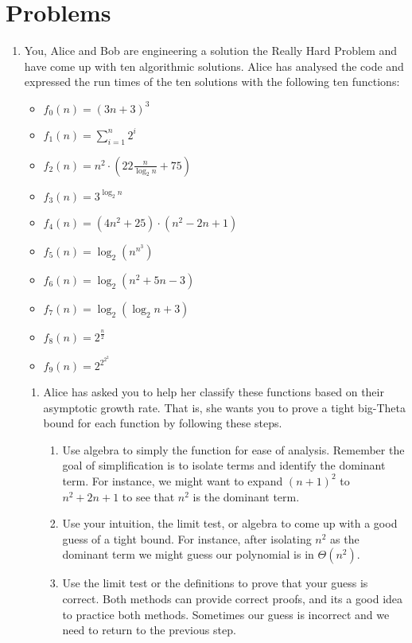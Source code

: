 \documentclass[paper=a4, fontsize=11pt]{scrartcl}
\numberwithin{equation}{section}		%
\numberwithin{figure}{section}			%
\numberwithin{table}{section}				%
\begin{document}
\section{Problems}
\begin{enumerate}
\item You, Alice and Bob are engineering a solution the Really Hard Problem and have come up with ten algorithmic solutions. Alice has analysed the code and expressed the run times of the ten solutions with the following ten functions:

\begin{itemize}
    \item $f_0(n) = (3n + 3)^3$ 
    \item $f_1(n) = \sum_{i=1}^n2^i$  
    \item $f_2(n) = n^2\cdot(22\frac{n}{\log_2n} + 75)$ 
    \item $f_3(n) = 3^{\log_2n}$
    \item $f_4(n) = (4n^2+25)\cdot(n^2-2n+1)$
    \item $f_5(n) = \log_2\left(n^{n^3}\right)$
    \item $f_6(n) = \log_2\left(n^2 + 5n - 3\right)$
    \item $f_7(n) = \log_2\left(\log_2n + 3\right)$
    \item $f_8(n) = 2^{\frac{n}{2}}$
    \item $f_9(n) = 2^{2^{2^2}}$
\end{itemize}

\begin{enumerate}
    \item Alice has asked you to help her classify these functions based on their asymptotic growth rate. That is, she wants you to prove a tight big-Theta bound for each function by following these steps.
    \begin{enumerate}
        \item Use algebra to simply the function for ease of analysis. Remember the goal of simplification is to isolate terms and identify the dominant term. For instance, we might want to expand $(n+1)^2$ to $n^2 +2n +1$ to see that $n^2$ is the dominant term.
        
        \item Use your intuition, the limit test, or algebra to come up with a good guess of a tight bound. For instance, after isolating $n^2$ as the dominant term we might guess our polynomial is in $\Theta(n^2)$.
        
        \item Use the limit test or the definitions to prove that your guess is correct. Both methods can provide correct proofs, and its a good idea to practice both methods. Sometimes our guess is incorrect and we need to return to the previous step.
        

\end{enumerate}
\end{enumerate}
\end{enumerate}
\end{document}

